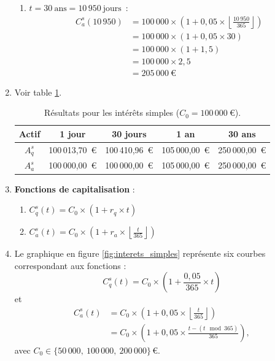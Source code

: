\documentclass{article}
\begin{document}
\begin{enumerate}[label=\textbf{R1.\arabic*}]
\begin{enumerate}[label=(\alph*)]
        \item $t = 30\ \text{ans} = 10\,950\ \text{jours}$~: 
        \begin{align*}
        C_a^s(10\,950) &= 100\,000 \times \left(1 + 0,05 \times \left\lfloor \frac{10\,950}{365} \right\rfloor \right) \\
                 &= 100\,000 \times \left(1 + 0,05 \times 30 \right) \\
                 &= 100\,000 \times \left(1 + 1,5 \right) \\
                 &= 100\,000 \times 2,5 \\
                 &= \boxed{205\,000\ \text{€}}
        \end{align*}
    \end{enumerate}

    \item Voir table \ref{tab:simple_interest_results}.
    \begin{table}[h!]
        \centering
        \begin{tabular}{|c|c|c|c|c|}
        \hline
        \textbf{Actif} & \textbf{1 jour} & \textbf{30 jours} & \textbf{1 an} & \textbf{30 ans} \\
        \hline
        \( A_q^s \) & 100\,013,70\ € & 100\,410,96\ € & 105\,000,00\ € & 250\,000,00\ € \\
        \hline
        \( A_a^s \) & 100\,000,00\ € & 100\,000,00\ € & 105\,000,00\ € & 250\,000,00\ € \\
        \hline
        \end{tabular}
        \caption{Résultats pour les intérêts simples (\( C_0 = 100\,000\ \text{€} \)).}
        \label{tab:simple_interest_results}
    \end{table}

    \item \textbf{Fonctions de capitalisation} :
    \begin{enumerate}[label=(\alph*)]
        \item \( C_q^s(t) = C_0 \times \left(1 + r_q \times t\right) \)
        \item \( C_a^s(t) = C_0 \times \left(1 + r_a \times \left\lfloor\frac{t}{365}\right\rfloor\right) \)
    \end{enumerate}

    \item Le graphique en figure \ref{fig:interets_simples} représente six courbes correspondant aux fonctions :
        \[
            C_q^s(t) = C_0 \times \left(1 + \frac{0{,}05}{365} \times t\right)
        \]
        et
        \[
        \begin{aligned}
            C_a^s(t) &= C_0 \times \left(1 + 0{,}05 \times \left\lfloor\frac{t}{365}\right\rfloor\right) \\
                     &= C_0 \times \left(1 + 0{,}05 \times \frac{t - (t \!\!\!\mod 365)}{365}\right),
        \end{aligned}
        \]
        avec \( C_0 \in \bigl\{50\,000,\ 100\,000,\ 200\,000\bigr\}\,\text{€} \).


\end{enumerate}
\end{document}
